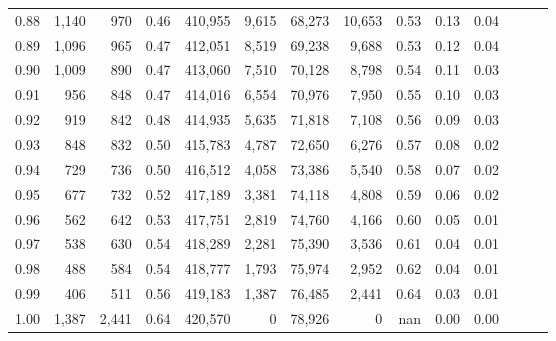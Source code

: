 \begin{tabular}{rrrrrrrrrrrrrr}
0.88 &   1,140 &    970 &  0.46 &  410,955 &    9,615 &  68,273 &  10,653 &  0.53 &  0.13 &      0.04 \\
0.89 &   1,096 &    965 &  0.47 &  412,051 &    8,519 &  69,238 &   9,688 &  0.53 &  0.12 &      0.04 \\
0.90 &   1,009 &    890 &  0.47 &  413,060 &    7,510 &  70,128 &   8,798 &  0.54 &  0.11 &      0.03 \\
0.91 &     956 &    848 &  0.47 &  414,016 &    6,554 &  70,976 &   7,950 &  0.55 &  0.10 &      0.03 \\
0.92 &     919 &    842 &  0.48 &  414,935 &    5,635 &  71,818 &   7,108 &  0.56 &  0.09 &      0.03 \\
0.93 &     848 &    832 &  0.50 &  415,783 &    4,787 &  72,650 &   6,276 &  0.57 &  0.08 &      0.02 \\
0.94 &     729 &    736 &  0.50 &  416,512 &    4,058 &  73,386 &   5,540 &  0.58 &  0.07 &      0.02 \\
0.95 &     677 &    732 &  0.52 &  417,189 &    3,381 &  74,118 &   4,808 &  0.59 &  0.06 &      0.02 \\
0.96 &     562 &    642 &  0.53 &  417,751 &    2,819 &  74,760 &   4,166 &  0.60 &  0.05 &      0.01 \\
0.97 &     538 &    630 &  0.54 &  418,289 &    2,281 &  75,390 &   3,536 &  0.61 &  0.04 &      0.01 \\
0.98 &     488 &    584 &  0.54 &  418,777 &    1,793 &  75,974 &   2,952 &  0.62 &  0.04 &      0.01 \\
0.99 &     406 &    511 &  0.56 &  419,183 &    1,387 &  76,485 &   2,441 &  0.64 &  0.03 &      0.01 \\
1.00 &   1,387 &  2,441 &  0.64 &  420,570 &        0 &  78,926 &       0 &   nan &  0.00 &      0.00 \\
\bottomrule
\end{tabular}
